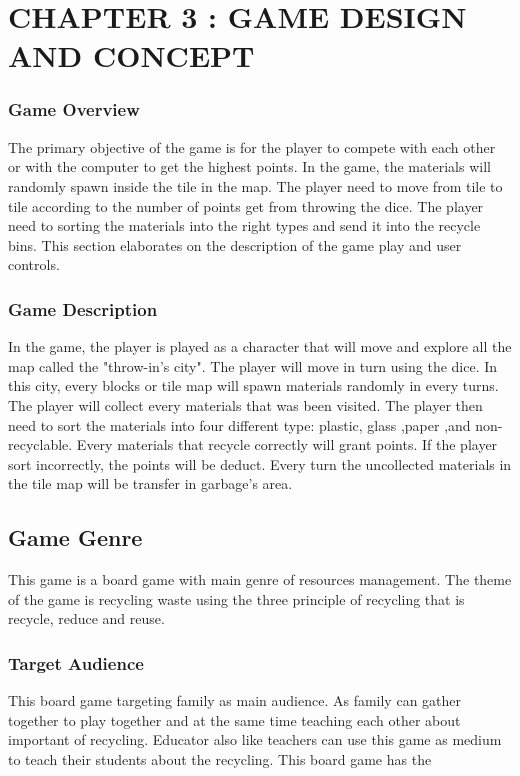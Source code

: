 \documentclass[12pt]{article}
\begin{document}

\pagebreak


\section{CHAPTER 3 : GAME DESIGN AND CONCEPT}

\subsubsection{Game Overview}
The primary objective of the game is for the player to compete with each other or with the computer to get the highest points. In the game, the materials will randomly spawn inside the tile in the map. The player need to move from tile to tile according to the number of points get from throwing the dice. The player need to sorting the materials into the right types and send it into the recycle bins. This section elaborates on the description of the game play and user controls.

\subsubsection{Game Description}
In the game, the player is played as a character that will move and explore all the map called the "throw-in's city". The player will move in turn using the dice. In this city, every blocks or tile map will spawn materials randomly in every turns. The player will collect every materials that was been visited. The player then need to sort the materials into four different type: plastic, glass ,paper ,and non-recyclable. Every materials that recycle correctly will grant points. If the player sort incorrectly, the points will be deduct. Every turn the uncollected materials in the tile map will be transfer in garbage's area. 

\subsection{Game Genre}
This game is a board game with main genre of resources management. The theme of the game is recycling waste using the three principle of recycling that is recycle, reduce and reuse.  

\subsubsection{Target Audience}
This board game targeting family as main audience. As family can gather together to play together and at the same time teaching each other about important of recycling. Educator also like teachers can use this game as medium to teach their students about the recycling. This board game has the 
\end{document}
